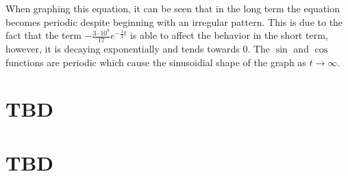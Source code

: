 \documentclass[twoside]{report}
\begin{document}
    \begin{remark}
        When graphing this equation, it can be seen that in the long term the equation becomes periodic despite beginning with an irregular pattern. This is due to the fact that the term $- \frac{3\cdot10^{8}}{17}e^{-\frac{1}{2}t}$ is able to affect the behavior in the short term, however, it is decaying exponentially and tends towards $0$. The $\sin$ and $\cos$ functions are periodic which cause the sinusoidial shape of the graph as $t \to \infty$.
    \end{remark}
    \chapter{TBD}
    \chapter{TBD}
\end{document}
